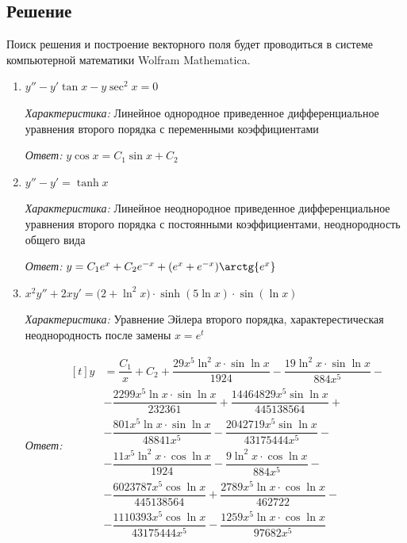 \documentclass[a4paper, 14pt, fleqn]{extarticle}
\begin{document}
		\subsection{Решение}
			\noindent Поиск решения и построение векторного поля будет проводиться в системе компьютерной математики Wolfram Mathematica.
			\begin{enumerate}
				\item \(y'' - y'\tan{x} - y\sec^2{x} = 0 \)

					\textit{Характеристика:} Линейное однородное приведенное дифференциальное уравнения второго порядка с переменными коэффициентами
		
					\textit{Ответ:} \( y\cos{x} = C_1\sin{x} + C_2 \)

				\item \(y'' - y' = \tanh{x} \)	

					\textit{Характеристика:} Линейное неоднородное приведенное дифференциальное уравнения второго порядка с постоянными коэффициентами, неоднородность общего вида
		
					\textit{Ответ:} \( y = C_1 e^x + C_2 e^{-x} + (e^x + e^{-x}) \arctg{e^x} \)
				\pagebreak
				\item \(x^2y'' + 2xy' = \Big(2 + \ln^2{x}\Big)\cdot \sinh{(5\ln{x})} \cdot \sin{(\ln{x})} \)

					\textit{Характеристика:} Уравнение Эйлера второго порядка, характерестическая неоднородность после замены \( x = e^t \)
		
					\textit{Ответ:} \(\begin{aligned}[t] y &= \dfrac{C_1}{x} + C_2 + \dfrac{29x^5\ln^2{x}\cdot\sin{\ln{x}}}{1924} - \dfrac{19\ln^2{x}\cdot\sin{\ln{x}}}{884x^5} - \\
											& - \dfrac{2299x^5\ln{x}\cdot\sin{\ln{x}}}{232361} + \dfrac{14464829x^5\sin{\ln{x}}}{445138564} + \\ 
											& - \dfrac{801x^5\ln{x}\cdot\sin{\ln{x}}}{48841x^5} - \dfrac{2042719x^5\sin{\ln{x}}}{43175444x^5} - \\
											&- \dfrac{11x^5\ln^2{x}\cdot\cos{\ln{x}}}{1924} - \dfrac{9\ln^2{x}\cdot\cos{\ln{x}}}{884x^5} - \\
											& - \dfrac{6023787x^5\cos{\ln{x}}}{445138564} + \dfrac{2789x^5\ln{x}\cdot\cos{\ln{x}}}{462722} - \\
											&  - \dfrac{1110393x^5\cos{\ln{x}}}{43175444x^5} - \dfrac{1259x^5\ln{x}\cdot\cos{\ln{x}}}{97682x^5}
										\end{aligned}\)


\end{enumerate}
\end{document}

